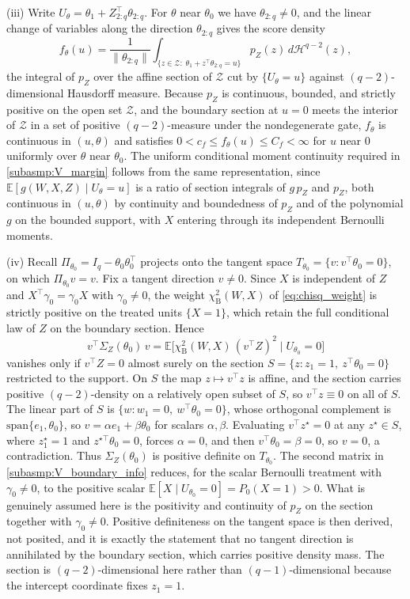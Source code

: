 \documentclass[11pt]{article}
\theoremstyle{definition}
\theoremstyle{plain}
\newcommand{\E}{\mathbb{E}}
\begin{document}
(iii) Write $U_\theta=\theta_1+Z_{2:q}^\top\theta_{2:q}$. For $\theta$ near $\theta_0$ we have $\theta_{2:q}\neq0$, and the linear change of variables along the direction $\theta_{2:q}$ gives the score density
\[
f_\theta(u)=\frac{1}{\|\theta_{2:q}\|}\int_{\{z\in\mathcal Z:\;\theta_1+z^\top\theta_{2:q}=u\}} p_Z(z)\,d\mathcal H^{q-2}(z),
\]
the integral of $p_Z$ over the affine section of $\mathcal Z$ cut by $\{U_\theta=u\}$ against $(q-2)$-dimensional Hausdorff measure. Because $p_Z$ is continuous, bounded, and strictly positive on the open set $\mathcal Z$, and the boundary section at $u=0$ meets the interior of $\mathcal Z$ in a set of positive $(q-2)$-measure under the nondegenerate gate, $f_\theta$ is continuous in $(u,\theta)$ and satisfies $0<c_f\le f_\theta(u)\le C_f<\infty$ for $u$ near $0$ uniformly over $\theta$ near $\theta_0$. The uniform conditional moment continuity required in \ref{subasmp:V_margin} follows from the same representation, since $\E[g(W,X,Z)\mid U_\theta=u]$ is a ratio of section integrals of $g\,p_Z$ and $p_Z$, both continuous in $(u,\theta)$ by continuity and boundedness of $p_Z$ and of the polynomial $g$ on the bounded support, with $X$ entering through its independent Bernoulli moments.

(iv) Recall $\Pi_{\theta_0}=I_q-\theta_0\theta_0^\top$ projects onto the tangent space $T_{\theta_0}=\{v:v^\top\theta_0=0\}$, on which $\Pi_{\theta_0}v=v$. Fix a tangent direction $v\neq0$. Since $X$ is independent of $Z$ and $X^\top\gamma_0=\gamma_0 X$ with $\gamma_0\neq0$, the weight $\chi^2_{\mathrm B}(W,X)$ of \eqref{eq:chisq_weight} is strictly positive on the treated units $\{X=1\}$, which retain the full conditional law of $Z$ on the boundary section. Hence
\[
v^\top\Sigma_Z(\theta_0)\,v=\E\big[\chi^2_{\mathrm B}(W,X)\,(v^\top Z)^2\mid U_{\theta_0}=0\big]
\]
vanishes only if $v^\top Z=0$ almost surely on the section $S=\{z:z_1=1,\ z^\top\theta_0=0\}$ restricted to the support. On $S$ the map $z\mapsto v^\top z$ is affine, and the section carries positive $(q-2)$-density on a relatively open subset of $S$, so $v^\top z\equiv0$ on all of $S$. The linear part of $S$ is $\{w:w_1=0,\ w^\top\theta_0=0\}$, whose orthogonal complement is $\mathrm{span}\{e_1,\theta_0\}$, so $v=\alpha e_1+\beta\theta_0$ for scalars $\alpha,\beta$. Evaluating $v^\top z^\star=0$ at any $z^\star\in S$, where $z^\star_1=1$ and $z^{\star\top}\theta_0=0$, forces $\alpha=0$, and then $v^\top\theta_0=\beta=0$, so $v=0$, a contradiction. Thus $\Sigma_Z(\theta_0)$ is positive definite on $T_{\theta_0}$. The second matrix in \ref{subasmp:V_boundary_info} reduces, for the scalar Bernoulli treatment with $\gamma_0\neq0$, to the positive scalar $\E[X\mid U_{\theta_0}=0]=P_0(X=1)>0$. What is genuinely assumed here is the positivity and continuity of $p_Z$ on the section together with $\gamma_0\neq0$. Positive definiteness on the tangent space is then derived, not posited, and it is exactly the statement that no tangent direction is annihilated by the boundary section, which carries positive density mass. The section is $(q-2)$-dimensional here rather than $(q-1)$-dimensional because the intercept coordinate fixes $z_1=1$.
\end{document}
